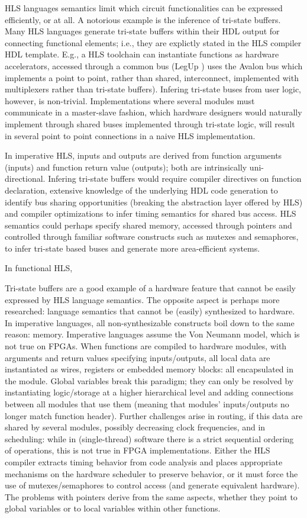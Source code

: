 HLS languages semantics limit which circuit functionalities can be expressed efficiently, or at all. A notorious example is the inference of tri-state buffers. Many HLS languages generate tri-state buffers within their HDL output for connecting functional elements; i.e., they are explictly stated in the HLS compiler HDL template. E.g., a HLS toolchain can instantiate functions as hardware accelerators, accessed through a common bus (LegUp \cite{canis2011legup}) uses the Avalon bus \cite{avalon} which implements a point to point, rather than shared, interconnect, implemented with multiplexers rather than tri-state buffers). Infering tri-state buses from user logic, however, is non-trivial. Implementations where several modules must communicate in a master-slave fashion, which hardware designers would naturally implement through shared buses implemented through tri-state logic, will result in several point to point connections in a naive HLS implementation.
\par In imperative HLS, inputs and outputs are derived from function arguments (inputs) and function return value (outputs); both are intrinsically uni-directional. Infering tri-state buffers would require compiler directives on function declaration, extensive knowledge of the underlying HDL code generation to identify bus sharing opportunities (breaking the abstraction layer offered by HLS) and compiler optimizations to infer timing semantics for shared bus access. HLS semantics could perhaps specify shared memory, accessed through pointers and controlled through familiar software constructs such as mutexes and semaphores, to infer tri-state based buses and generate more area-efficient systems.
\par In functional HLS,  
\par Tri-state buffers are a good example of a hardware feature that cannot be easily expressed by HLS language semantics. The opposite aspect is perhaps more researched: language semantics that cannot be (easily) synthesized to hardware. In imperative languages, all non-synthesizable constructs boil down to the same reason: memory. Imperative languages assume the Von Neumann model, which is not true on FPGAs. When functions are compiled to hardware modules, with arguments and return values specifying inputs/outputs, all local data are instantiated as wires, registers or embedded memory blocks: all encapsulated in the module. Global variables break this paradigm; they can only be resolved by instantiating logic/storage at a higher hierarchical level and adding connections between all modules that use them (meaning that modules' inputs/outputs no longer match function header). Further challenges arise in routing, if this data are shared by several modules, possibly decreasing clock frequencies, and in scheduling: while in (single-thread) software there is a strict sequential ordering of operations, this is not true in FPGA implementations. Either the HLS compiler extracts timing behavior from code analysis and places appropriate mechanisms on the hardware scheduler to preserve behavior, or it must force the use of mutexes/semaphores to control access (and generate equivalent hardware). The problems with pointers derive from the same aspects, whether they point to global variables or to local variables within other functions.
